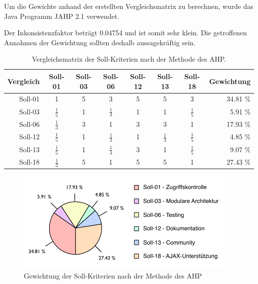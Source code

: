   Um die Gewichte anhand der erstellten Vergleichsmatrix zu berechnen, wurde das
  Java Programm JAHP 2.1 verwendet.
  
  Der Inkonsistenzfaktor beträgt 0.04754 und ist somit sehr klein. Die
  getroffenen Annahmen der Gewichtung sollten deshalb aussagekräftig sein.
  \newline
  
  \begin{table}[!h]
    \sffamily 
    \begin{center}
      \begin{tabular}{r|cccccc|r}
        \toprule
        \textbf{Vergleich} & Soll-01 & Soll-03 & Soll-06 & Soll-12 & Soll-13 &
        Soll-18 & \textbf{Gewichtung}\\
        \midrule
        Soll-01 & 1 & 5 & 3 & 5 & 5 & 3 & 34.81 \%\\
        Soll-03 & $\frac{1}{5}$ & 1 & $\frac{1}{3}$ & 1 & 1 & $\frac{1}{5}$ &
        5.91 \%\\
        Soll-06 & $\frac{1}{3}$ & 3 & 1 & 3 & 3 & 1 & 17.93 \%\\
        Soll-12 & $\frac{1}{5}$ & 1 & $\frac{1}{3}$ & 1 & $\frac{1}{3}$ &
        $\frac{1}{5}$ & 4.85 \% \\
        Soll-13 & $\frac{1}{5}$ & 1 & $\frac{1}{3}$ & 3 & 1 & $\frac{1}{5}$ &
        9.07 \%\\ Soll-18 & $\frac{1}{3}$ & 5 & 1 & 5 & 5 & 1 & 27.43 \%\\
        \bottomrule
      \end{tabular}
      \caption{Vergleichsmatrix der Soll-Kriterien nach der Methode des AHP.}
      \label{tab:gewichtungDerSollKriterien}
    \end{center}
  \end{table}
  
  \begin{figure}[ht]
    \begin{center}
      \includegraphics[width=0.95\textwidth]{./image/gewichtungSollKriterien.pdf}
      \caption{Gewichtung der Soll-Kriterien nach der Methode des AHP}
      \label{img:gewichtungSollKriterien}
    \end{center}
  \end{figure}
  

